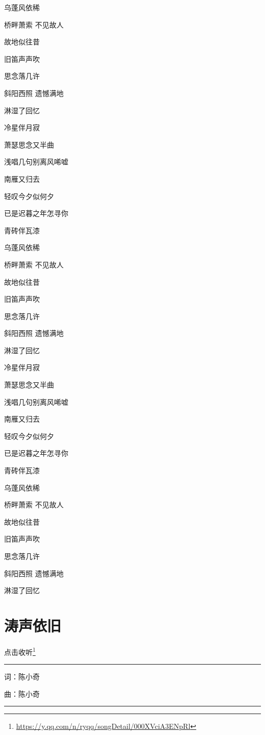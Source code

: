 \documentclass[]{ctexbook}
\renewcommand{\href}[2]{#2\footnote{\url{#1}}}
\begin{document}
乌蓬风依稀

桥畔萧索 不见故人

故地似往昔

旧笛声声吹

思念落几许

斜阳西照 遗憾满地

淋湿了回忆

冷星伴月寂

萧瑟思念又半曲

浅唱几句别离风唏嘘

南雁又归去

轻叹今夕似何夕

已是迟暮之年怎寻你

青砖伴瓦漆

乌蓬风依稀

桥畔萧索 不见故人

故地似往昔

旧笛声声吹

思念落几许

斜阳西照 遗憾满地

淋湿了回忆

冷星伴月寂

萧瑟思念又半曲

浅唱几句别离风唏嘘

南雁又归去

轻叹今夕似何夕

已是迟暮之年怎寻你

青砖伴瓦漆

乌蓬风依稀

桥畔萧索 不见故人

故地似往昔

旧笛声声吹

思念落几许

斜阳西照 遗憾满地

淋湿了回忆

\section*{涛声依旧}\label{taoshengyijiu}


\href{https://y.qq.com/n/ryqq/songDetail/000XVciA3ENpRl}{点击收听}

\begin{center}\rule{0.5\linewidth}{0.5pt}\end{center}

词：陈小奇

曲：陈小奇

\begin{center}\rule{0.5\linewidth}{0.5pt}\end{center}
\end{document}
